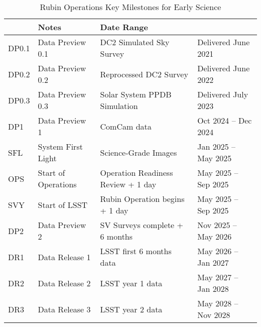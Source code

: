 \begin{table}[ht]
\centering
\fontsize{10}{12}\selectfont 
{} %
\setlength{\tabcolsep}{9pt} %
\renewcommand{\arraystretch}{1.6} %
\begin{tabular}[!hb]{l|l|l|l} \hline
\rowcolor{RubinTeal2} 
 \multicolumn{2}{|l|}{\textbf{Event}} &  \textbf{Notes}             &   \textbf{Date Range}  \\\hline\hline
DP0.1  & Data Preview 0.1   &  DC2 Simulated Sky Survey                &  Delivered June 2021                  \\
DP0.2 & Data Preview 0.2     &  Reprocessed DC2 Survey                 & Delivered June 2022                  \\
DP0.3 &  Data Preview 0.3     &   Solar System PPDB Simulation       & Delivered July 2023                  \\
DP1   &  Data Preview 1        &   ComCam data                                   & Oct 2024 -- Dec 2024  \\
SFL    & System First Light    &   Science-Grade Images                      & Jan 2025 -- May 2025  \\
OPS   & Start of Operations  & Operation Readiness Review  + 1 day & May 2025 -- Sep 2025 \\ 
SVY   & Start of LSST           & Rubin Operation begins + 1 day  & May 2025 -- Sep 2025 \\
DP2   & Data Preview 2        & SV Surveys complete  + 6 months  &  Nov 2025 -- May 2026 \\
DR1   & Data Release 1        & LSST  first 6 months data & May 2026 -- Jan 2027 \\
DR2   & Data Release 2        & LSST  year 1 data & May 2027 -- Jan 2028 \\
DR3   & Data Release 3        & LSST  year 2 data &  May 2028 -- Nov 2028 \\\hline\hline
\end{tabular}
\caption{Rubin Operations Key Milestones for Early Science}
\label{tab:milestones}
\end{table}
